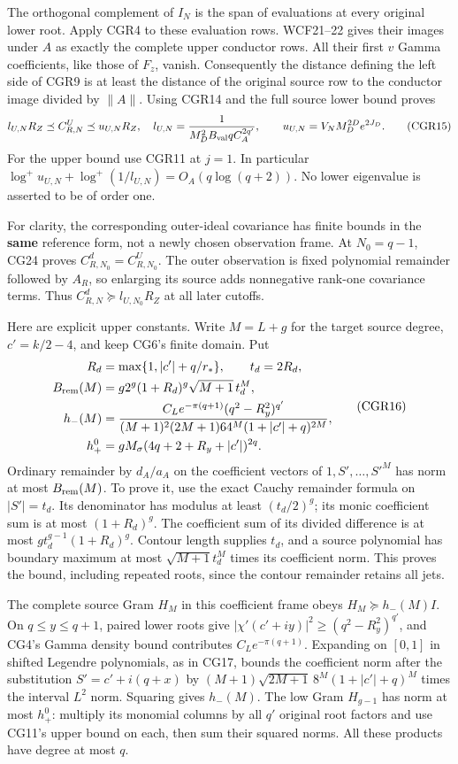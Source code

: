 The orthogonal complement of \(I_N\) is the span of evaluations at every original lower root. Apply CGR4 to these evaluation rows. WCF21--22 gives their images under \(A\) as exactly the complete upper conductor rows. All their first \(v\) Gamma coefficients, like those of \(F_z\), vanish. Consequently the distance defining the left side of CGR9 is at least the distance of the original source row to the conductor image divided by \(\|A\|\). Using CGR14 and the full source lower bound proves \[
l_{U,N}R_Z\preceq C_{R,N}^U\preceq u_{U,N}R_Z,
\quad
l_{U,N}=\frac1{M_D^2 B_{\rm val}q C_A^{2q'}},\qquad
u_{U,N}=V_N M_D^{2D}e^{2J_D}.
\tag{CGR15}
\] For the upper bound use CGR11 at \(j=1\). In particular \(\log^+u_{U,N}+\log^+(1/l_{U,N})=O_A(q\log(q+2))\). No lower eigenvalue is asserted to be of order one.

For clarity, the corresponding outer-ideal covariance has finite bounds in the \textbf{same} reference form, not a newly chosen observation frame. At \(N_0=q-1\), CG24 proves \(C_{R,N_0}^d=C_{R,N_0}^U\). The outer observation is fixed polynomial remainder followed by \(A_R\), so enlarging its source adds nonnegative rank-one covariance terms. Thus \(C_{R,N}^d\succeq l_{U,N_0}R_Z\) at all later cutoffs.

Here are explicit upper constants. Write \(M=L+g\) for the target source degree, \(c'=k/2-4\), and keep CG6's finite domain. Put \[
\begin{split}
R_d&=\max\{1,|c'|+q/r_*\},\qquad t_d=2R_d,\\
B_{\rm rem}(M)&=g2^g(1+R_d)^g\sqrt{M+1}\,t_d^M,\\
h_-(M)&=\frac{C_Le^{-\pi(q+1)}(q^2-R_y^2)^{q'}}
{(M+1)^2(2M+1)64^M(1+|c'|+q)^{2M}},\\
h_+^0&=gM_\sigma(4q+2+R_y+|c'|)^{2q}.
\end{split}\tag{CGR16}
\] Ordinary remainder by \(d_A/a_A\) on the coefficient vectors of \(1,S',\ldots,S'^M\) has norm at most \(B_{\rm rem}(M)\). To prove it, use the exact Cauchy remainder formula on \(|S'|=t_d\). Its denominator has modulus at least \((t_d/2)^g\); its monic coefficient sum is at most \((1+R_d)^g\). The coefficient sum of its divided difference is at most \(g t_d^{g-1}(1+R_d)^g\). Contour length supplies \(t_d\), and a source polynomial has boundary maximum at most \(\sqrt{M+1}t_d^M\) times its coefficient norm. This proves the bound, including repeated roots, since the contour remainder retains all jets.

The complete source Gram \(H_M\) in this coefficient frame obeys \(H_M\succeq h_-(M)I\). On \(q\le y\le q+1\), paired lower roots give \(|\chi'(c'+iy)|^2\ge(q^2-R_y^2)^{q'}\), and CG4's Gamma density bound contributes \(C_Le^{-\pi(q+1)}\). Expanding on \([0,1]\) in shifted Legendre polynomials, as in CG17, bounds the coefficient norm after the substitution \(S'=c'+i(q+x)\) by \((M+1)\sqrt{2M+1}\,8^M(1+|c'|+q)^M\) times the interval \(L^2\) norm. Squaring gives \(h_-(M)\). The low Gram \(H_{g-1}\) has norm at most \(h_+^0\): multiply its monomial columns by all \(q'\) original root factors and use CG11's upper bound on each, then sum their squared norms. All these products have degree at most \(q\).

